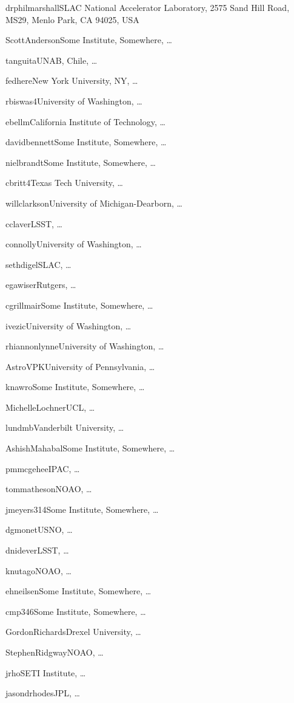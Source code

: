
\vspace{4\baselineskip}


\vspace{\baselineskip}

\author{Phil Marshall}{drphilmarshall}{SLAC National Accelerator Laboratory, 2575 Sand Hill Road, MS29, Menlo Park, CA 94025, USA}
\author{Scott Anderson}{ScottAnderson}{Some Institute, Somewhere, \ldots}
\author{Timo Anguita}{tanguita}{UNAB, Chile, \ldots}
\author{Federica B. Bianco}{fedhere}{New York University, NY, \ldots}
\author{Rahul Biswas}{rbiswas4}{University of Washington, \ldots}
\author{Eric C.\ Bellm}{ebellm}{California Institute of Technology, \ldots}
\author{David Bennett}{davidbennett}{Some Institute, Somewhere, \ldots}
\author{Niel Brandt}{nielbrandt}{Some Institute, Somewhere, \ldots}
\author{Chris Britt}{cbritt4}{Texas Tech University, \ldots}
\author{Will Clarkson}{willclarkson}{University of Michigan-Dearborn, \ldots}
\author{Chuck Claver}{cclaver}{LSST, \ldots}
\author{Andy Connolly}{connolly}{University of Washington, \ldots}
\author{Seth Digel}{sethdigel}{SLAC, \ldots}
\author{Eric Gawiser}{egawiser}{Rutgers, \ldots}
\author{Carl Grillmair}{cgrillmair}{Some Institute, Somewhere, \ldots}
\author{\v{Z}eljko Ivezi\'{c}}{ivezic}{University of Washington, \ldots}
\author{Lynne Jones}{rhiannonlynne}{University of Washington, \ldots}
\author{Vishal Kasliwal}{AstroVPK}{University of Pennsylvania, \ldots}
\author{Someonecalled Knawro}{knawro}{Some Institute, Somewhere, \ldots}
\author{Michelle Lochner}{MichelleLochner}{UCL, \ldots}
\author{Michael B.\ Lund}{lundmb}{Vanderbilt University, \ldots}
\author{Ashish Mahabal}{AshishMahabal}{Some Institute, Somewhere, \ldots}
\author{Peregrine McGehee}{pmmcgehee}{IPAC, \ldots}
\author{Tom Matheson}{tommatheson}{NOAO, \ldots}
\author{Josh Meyers}{jmeyers314}{Some Institute, Somewhere, \ldots}
\author{Dave Monet}{dgmonet}{USNO, \ldots}
\author{David Nidever}{dnidever}{LSST, \ldots}
\author{Knut Olsen}{knutago}{NOAO, \ldots}
\author{Eric Neilsen}{ehneilsen}{Some Institute, Somewhere, \ldots}
\author{Christina Peters}{cmp346}{Some Institute, Somewhere, \ldots}
\author{Gordon Richards}{GordonRichards}{Drexel University, \ldots}
\author{Stephen Ridgway}{StephenRidgway}{NOAO, \ldots}
\author{Jeonghee Rho}{jrho}{SETI Institute, \ldots}
\author{Jason Rhodes}{jasondrhodes}{JPL, \ldots}
